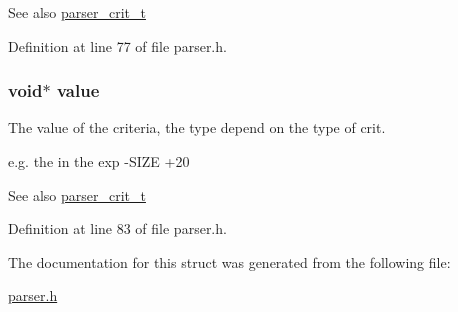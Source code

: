 \begin{DoxySeeAlso}{See also}
\hyperlink{parser_8h_a4dcbe7148b91f50b0e7f3e08e780861d}{parser\+\_\+crit\+\_\+t} 
\end{DoxySeeAlso}


Definition at line 77 of file parser.\+h.

\subsubsection[{\texorpdfstring{value}{value}}]{\setlength{\rightskip}{0pt plus 5cm}void$\ast$ value}\hypertarget{structparser__t_a0f61d63b009d0880a89c843bd50d8d76}{}\label{structparser__t_a0f61d63b009d0880a89c843bd50d8d76}


The value of the criteria, the type depend on the type of \textquotesingle{}crit\textquotesingle{}. 


\begin{DoxyItemize}
\item e.\+g. the {} in the exp {\ttfamily -\/\+S\+I\+ZE +20}
\end{DoxyItemize}

\begin{DoxySeeAlso}{See also}
\hyperlink{parser_8h_a4dcbe7148b91f50b0e7f3e08e780861d}{parser\+\_\+crit\+\_\+t} 
\end{DoxySeeAlso}


Definition at line 83 of file parser.\+h.



The documentation for this struct was generated from the following file\+:\begin{DoxyCompactItemize}
\item 
\hyperlink{parser_8h}{parser.\+h}\end{DoxyCompactItemize}
